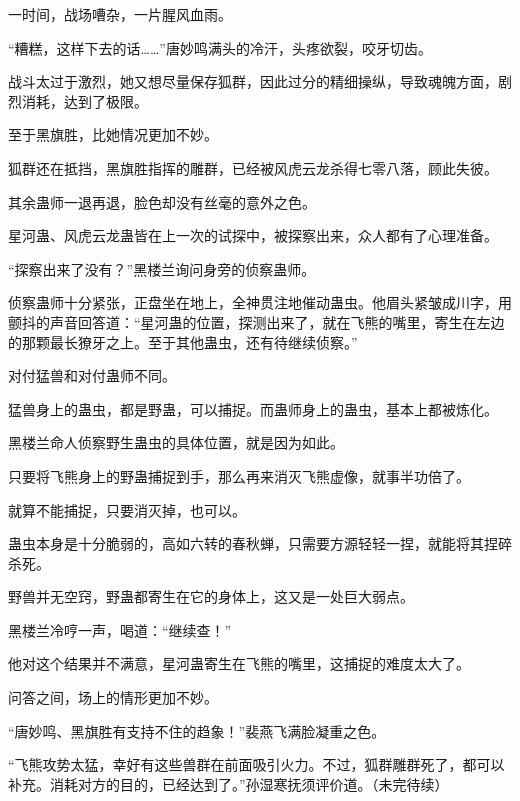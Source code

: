 \begin{this_body}
一时间，战场嘈杂，一片腥风血雨。

“糟糕，这样下去的话……”唐妙鸣满头的冷汗，头疼欲裂，咬牙切齿。

战斗太过于激烈，她又想尽量保存狐群，因此过分的精细操纵，导致魂魄方面，剧烈消耗，达到了极限。

至于黑旗胜，比她情况更加不妙。

狐群还在抵挡，黑旗胜指挥的雕群，已经被风虎云龙杀得七零八落，顾此失彼。

其余蛊师一退再退，脸色却没有丝毫的意外之色。

星河蛊、风虎云龙蛊皆在上一次的试探中，被探察出来，众人都有了心理准备。

“探察出来了没有？”黑楼兰询问身旁的侦察蛊师。

侦察蛊师十分紧张，正盘坐在地上，全神贯注地催动蛊虫。他眉头紧皱成川字，用颤抖的声音回答道：“星河蛊的位置，探测出来了，就在飞熊的嘴里，寄生在左边的那颗最长獠牙之上。至于其他蛊虫，还有待继续侦察。”

对付猛兽和对付蛊师不同。

猛兽身上的蛊虫，都是野蛊，可以捕捉。而蛊师身上的蛊虫，基本上都被炼化。

黑楼兰命人侦察野生蛊虫的具体位置，就是因为如此。

只要将飞熊身上的野蛊捕捉到手，那么再来消灭飞熊虚像，就事半功倍了。

就算不能捕捉，只要消灭掉，也可以。

蛊虫本身是十分脆弱的，高如六转的春秋蝉，只需要方源轻轻一捏，就能将其捏碎杀死。

野兽并无空窍，野蛊都寄生在它的身体上，这又是一处巨大弱点。

黑楼兰冷哼一声，喝道：“继续查！”

他对这个结果并不满意，星河蛊寄生在飞熊的嘴里，这捕捉的难度太大了。

问答之间，场上的情形更加不妙。

“唐妙鸣、黑旗胜有支持不住的趋象！”裴燕飞满脸凝重之色。

“飞熊攻势太猛，幸好有这些兽群在前面吸引火力。不过，狐群雕群死了，都可以补充。消耗对方的目的，已经达到了。”孙湿寒抚须评价道。（未完待续）

\end{this_body}

